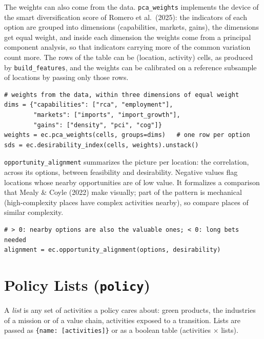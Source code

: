 \documentclass[12pt, a4paper]{article}
\newcommand{\fn}[1]{\texttt{#1}}
\begin{document}
\begin{sloppypar}
The weights can also come from the data. \fn{pca\_weights} implements the
device of the smart diversification score of Romero et al.\ (2025): the
indicators of each option are grouped into dimensions (capabilities,
markets, gains), the dimensions get equal weight, and inside each
dimension the weights come from a principal component analysis, so that
indicators carrying more of the common variation count more. The rows of
the table can be (location, activity) cells, as produced by
\fn{build\_features}, and the weights can be calibrated on a reference
subsample of locations by passing only those rows.
\end{sloppypar}

\begin{lstlisting}[caption={Weights by principal components (smart diversification score)}]
# weights from the data, within three dimensions of equal weight
dims = {"capabilities": ["rca", "employment"],
        "markets": ["imports", "import_growth"],
        "gains": ["density", "pci", "cog"]}
weights = ec.pca_weights(cells, groups=dims)   # one row per option
sds = ec.desirability_index(cells, weights).unstack()
\end{lstlisting}

\begin{sloppypar}
\fn{opportunity\_alignment} summarizes the picture per location: the
correlation, across its options, between feasibility and desirability.
Negative values flag locations whose nearby opportunities are of low
value. It formalizes a comparison that Mealy \& Coyle (2022) make
visually; part of the pattern is mechanical (high-complexity places have
complex activities nearby), so compare places of similar complexity.
\end{sloppypar}

\begin{lstlisting}[caption={Alignment between feasibility and desirability}]
# > 0: nearby options are also the valuable ones; < 0: long bets needed
alignment = ec.opportunity_alignment(options, desirability)
\end{lstlisting}

\section{Policy Lists (\texttt{policy})}

A \emph{list} is any set of activities a policy cares about: green
products, the industries of a mission or of a value chain, activities
exposed to a transition. Lists are passed as
\texttt{\{name: [activities]\}} or as a boolean table (activities
$\times$ lists).
\end{document}

